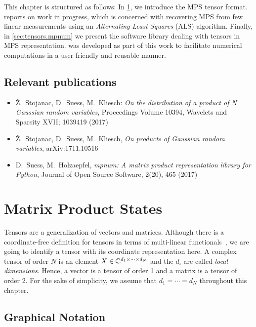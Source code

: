 This chapter is structured as follows:
In \cref{sec:tensors.mps}, we introduce the MPS tensor format.
 reports on work in progress, which is concerned with recovering MPS from few linear measurements using an \emph{Alternating Least Squares} (ALS) algorithm.
Finally, in \cref{sec:tensors.mpnum} we present the software library \mpnum dealing with tensors in MPS representation.
\mpnum was developed as part of this work to facilitate numerical computations in a user friendly and reusable manner.


\subsection*{Relevant publications}
\begin{itemize}
  \item Ž.\ Stojanac, D.\ Suess, M.\ Kliesch: \textit{On the distribution of a product of N Gaussian random variables}, Proceedings Volume 10394, Wavelets and Sparsity XVII; 1039419 (2017)
  \item Ž.\ Stojanac, D.\ Suess, M.\ Kliesch, \textit{On products of Gaussian random variables}, arXiv:1711.10516
  \item D.\ Suess, M.\ Holzaepfel, \textit{mpnum: A matrix product representation library for Python}, Journal of Open Source Software, 2(20), 465 (2017)
\end{itemize}
\section{Matrix Product States}%
\label{sec:tensors.mps}

Tensors are a generalization of vectors and matrices.
Although there is a coordinate-free definition for tensors in terms of multi-linear functionals~\cite{Browder_2012_Mathematical}, we are going to identify a tensor with its coordinate representation here.
A complex tensor of order $N$ is an element $X \in {\mathbb{C}}^{d_1 \times \cdots \times d_N}$ and the $d_i$ are called \emph{local dimensions}.
Hence, a vector is a tensor of order 1 and a matrix is a tensor of order 2.
For the sake of simplicity, we assume that $d_1 = \cdots = d_N$ throughout this chapter.



\subsection{Graphical Notation}
\label{sub:mps.graphical_notation}

